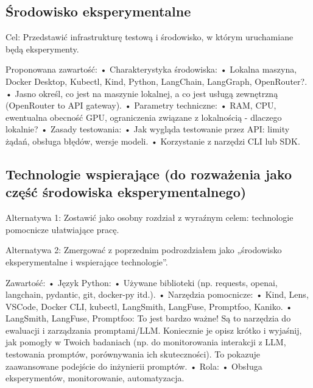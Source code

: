 \subsection{Środowisko eksperymentalne}

Cel: Przedstawić infrastrukturę testową i środowisko, w którym uruchamiane będą eksperymenty.

Proponowana zawartość:
	•	Charakterystyka środowiska:
	•	    Lokalna maszyna, Docker Desktop, Kubectl, Kind, Python, LangChain, LangGraph, OpenRouter?.
	•		Jasno określ, co jest na maszynie lokalnej, a co jest usługą zewnętrzną (OpenRouter to API gateway).
	•	Parametry techniczne:
	•	    RAM, CPU, ewentualna obecność GPU, ograniczenia związane z lokalnością - dlaczego lokalnie?
	•	Zasady testowania:
	•	    Jak wygląda testowanie przez API: limity żądań, obsługa błędów, wersje modeli.
	•	    Korzystanie z narzędzi CLI lub SDK.



\subsection{Technologie wspierające (do rozważenia jako część środowiska eksperymentalnego)}

Alternatywa 1: Zostawić jako osobny rozdział z wyraźnym celem: technologie pomocnicze ułatwiające pracę.

Alternatywa 2: Zmergować z poprzednim podrozdziałem jako „środowisko eksperymentalne i wspierające technologie”.

Zawartość:
	•	Język Python:
	•	    Używane biblioteki (np. requests, openai, langchain, pydantic, git, docker-py itd.).
	•	Narzędzia pomocnicze:
	•	    Kind, Lens, VSCode, Docker CLI, kubectl, LangSmith, LangFuse, Promptfoo, Kaniko.
	•		LangSmith, LangFuse, Promptfoo: To jest bardzo ważne! Są to narzędzia do ewaluacji i zarządzania promptami/LLM. Koniecznie je opisz krótko i wyjaśnij, jak pomogły w Twoich badaniach (np. do monitorowania interakcji z LLM, testowania promptów, porównywania ich skuteczności). To pokazuje zaawansowane podejście do inżynierii promptów.
	•	Rola:
	•	    Obsługa eksperymentów, monitorowanie, automatyzacja.



